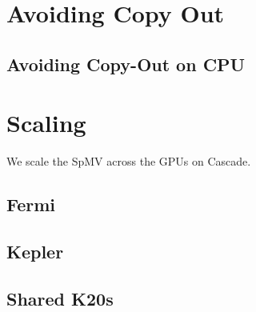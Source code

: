 \documentclass{report}
\begin{document}
\section{Avoiding Copy Out}

\subsection{Avoiding Copy-Out on CPU}

\section{Scaling}
We scale the SpMV across the GPUs on Cascade.

\subsection{Fermi}
\subsection{Kepler}

\subsection{Shared K20s}


\ifstandalone


\end{document}

